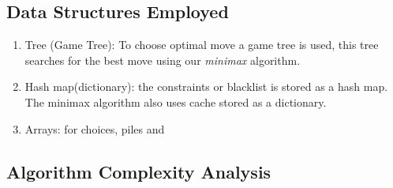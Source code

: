 \documentclass{article}
\begin{document}
\subsection*{Data Structures Employed}
\begin{enumerate}
  \item Tree (Game Tree): To choose optimal move a game tree is used, this tree searches for the best move using our \textit{minimax} algorithm. 
  \item Hash map(dictionary): the constraints or blacklist is stored as a hash map. The minimax algorithm also uses cache stored as a dictionary. 
  \item Arrays: for choices, piles and
\end{enumerate}
\subsection*{Algorithm Complexity Analysis}
\end{document}
